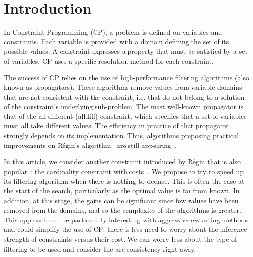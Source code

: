 \section{Introduction} 

In Constraint Programming (CP), a problem is defined on variables and constraints. Each variable is provided with a domain defining the set of its possible values. A constraint expresses a property that must be satisfied by a set of variables. CP uses a specific resolution method for each constraint. 

The success of CP relies on the use of high-performance filtering algorithms (also known as propagators). These algorithms remove values from variable domains that are not consistent with the constraint, i.e. that do not belong to a solution of the constraint's underlying sub-problem.
The most well-known propagator is that of the all different (alldiff) constraint, which specifies that a set of variables must all take different values. The efficiency in practice of that propagator strongly depends on its implementation. Thus, algorithms proposing practical improvements on Régin's algorithm~\cite{Regin:AfilteringalgorithmforconstraintsofdifferenceinCSPs} are still appearing~\cite{Zhang:AFastAlgorithmforGeneralizedArcConsistencyoftheAlldifferentConstraint,Zhang:EarlyandEfficientIdentificationofUselessConstraintPropagationforAlldifferentConstraints}.


In this article, we consider another constraint introduced by Régin that is also popular~\cite{Demassey:ACost-RegularBasedHybridColumnGenerationApproach,Nightingale:AutomaticallyimprovingconstraintmodelsinSavileRow,vanHoeve:Onglobalwarming:Flow-basedsoftglobalconstraints,Gualandi:ConstraintProgramming-basedColumnGeneration,Ducomman:AlternativeFilteringfortheWeightedCircuitConstraint:ComparingLowerBoundsfortheTSPandSolvingTSPTW}: the cardinality constraint with costs~\cite{Regin:CostbasedArcConsistencyforGlobalCardinalityConstraints}. 
We propose to try to speed up its filtering algorithm when there is nothing to deduce.
This is often the case at the start of the search, particularly as the optimal value is far from known. In addition, at this stage, the gains can be significant since few values have been removed from the domains, and so the complexity of the algorithms is greater. This approach can be particularly interesting with aggressive restarting methods and could simplify the use of CP: there is less need to worry about the inference strength of constraints versus their cost. We can worry less about the type of filtering to be used and consider the arc consistency right away. 


